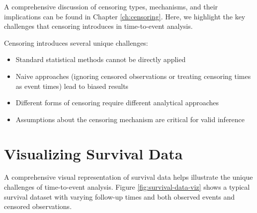 A comprehensive discussion of censoring types, mechanisms, and their implications can be found in Chapter \ref{ch:censoring}. Here, we highlight the key challenges that censoring introduces in time-to-event analysis.

\begin{notebox}[title=Key Challenges with Censored Data]
Censoring introduces several unique challenges:
\begin{itemize}
\item Standard statistical methods cannot be directly applied
\item Naive approaches (ignoring censored observations or treating censoring times as event times) lead to biased results
\item Different forms of censoring require different analytical approaches
\item Assumptions about the censoring mechanism are critical for valid inference
\end{itemize}
\end{notebox}

\section{Visualizing Survival Data}

A comprehensive visual representation of survival data helps illustrate the unique challenges of time-to-event analysis. Figure \ref{fig:survival-data-viz} shows a typical survival dataset with varying follow-up times and both observed events and censored observations.

